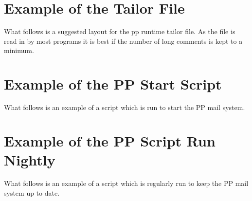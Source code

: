 \chapter {Example of the Tailor File}\label{app:tailor}

What follows is a suggested layout for the pp runtime tailor file. 
As the file is read in by most programs it is best if the number
of long comments is kept to a minimum.


\chapter {Example of the PP Start Script}\label{app:pp.start}

What follows is an example of a script which is run to start the PP
mail system.


\chapter {Example of the PP Script Run Nightly}\label{app:pp.nightly}

What follows is an example of a script which is regularly run to keep
the PP mail system up to date.

